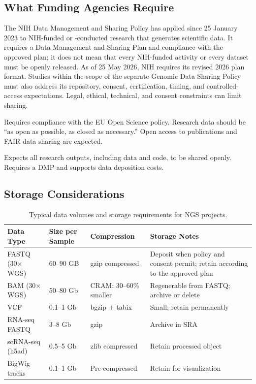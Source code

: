 \subsection{What Funding Agencies Require}

\begin{description}[style=nextline, font=\bfseries, itemsep=3pt]
  \item[NIH (USA)]
  The NIH Data Management and Sharing Policy has applied since 25 January 2023 to NIH-funded or -conducted research that generates scientific data. It requires a Data Management and Sharing Plan and compliance with the approved plan; it does not mean that every NIH-funded activity or every dataset must be openly released. As of 25 May 2026, NIH requires its revised 2026 plan format. Studies within the scope of the separate Genomic Data Sharing Policy must also address its repository, consent, certification, timing, and controlled-access expectations. Legal, ethical, technical, and consent constraints can limit sharing.

  \item[ERC (European Research Council)]
  Requires compliance with the EU Open Science policy. Research data should be ``as open as possible, as closed as necessary.'' Open access to publications and FAIR data sharing are expected.

  \item[Wellcome Trust (UK)]
  Expects all research outputs, including data and code, to be shared openly. Requires a DMP and supports data deposition costs.
\end{description}

\subsection{Storage Considerations}

\begin{table}[htbp]
\centering
\caption{Typical data volumes and storage requirements for NGS projects.}
\label{tab:storage}
\small
\begin{tabularx}{\textwidth}{@{}l l l X@{}}
\toprule
\textbf{Data Type} & \textbf{Size per Sample} & \textbf{Compression} & \textbf{Storage Notes} \\
\midrule
FASTQ (30$\times$ WGS) & 60--90 GB & gzip compressed & Deposit when policy and consent permit; retain according to the approved plan \\
BAM (30$\times$ WGS) & 50--80 Gb & CRAM: 30--60\% smaller & Regenerable from FASTQ; archive or delete \\
VCF & 0.1--1 Gb & bgzip + tabix & Small; retain permanently \\
RNA-seq FASTQ & 3--8 Gb & gzip & Archive in SRA \\
scRNA-seq (h5ad) & 0.5--5 Gb & zlib compressed & Retain processed object \\
BigWig tracks & 0.1--1 Gb & Pre-compressed & Retain for visualization \\
\bottomrule
\end{tabularx}
\end{table}

